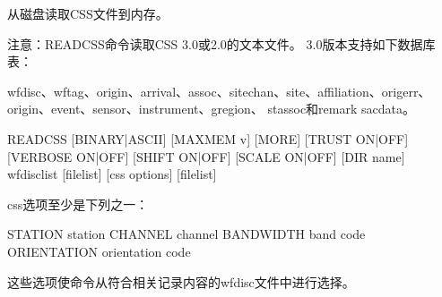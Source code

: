 \label{cmd:readcss}

从磁盘读取CSS文件到内存。

注意：READCSS命令读取CSS 3.0或2.0的文本文件。
3.0版本支持如下数据库表：

wfdisc、wftag、origin、arrival、assoc、sitechan、site、affiliation、origerr、origin、event、sensor、instrument、gregion、
stassoc和remark sacdata。

\begin{SACSTX}
READCSS [BINARY|ASCII] [MAXMEM v] [MORE] [TRUST ON|OFF]
[VERBOSE ON|OFF] [SHIFT ON|OFF] [SCALE ON|OFF] %
[DIR name] wfdisclist [filelist] [css options] [filelist]
\end{SACSTX}

css选项至少是下列之一：

\begin{SACSTX}
STATION station
CHANNEL channel
BANDWIDTH band code
ORIENTATION orientation code
\end{SACSTX}

这些选项使命令从符合相关记录内容的wfdisc文件中进行选择。

